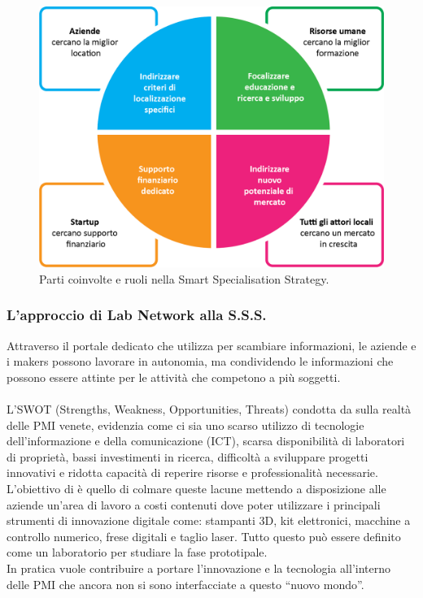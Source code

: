 \begin{figure}[H]
	\begin{center}
	\includegraphics[scale=0.37]{immagini/sss_graph.png}
	\caption{Parti coinvolte e ruoli nella Smart Specialisation Strategy.}
	\end{center}
\end{figure}
\subsubsection{L'approccio di Lab Network alla S.S.S.}
Attraverso il portale dedicato che \lab{} utilizza per scambiare informazioni, le aziende e i makers possono lavorare in autonomia, ma condividendo le informazioni che possono essere attinte per le attività che competono a più soggetti.\\
\\
L'\gls{SWOT} (Strengths, Weakness, Opportunities, Threats) condotta da \lab{} sulla realtà delle PMI venete, evidenzia come ci sia uno scarso utilizzo di tecnologie dell'informazione e della comunicazione (ICT), scarsa disponibilità di laboratori di proprietà, bassi investimenti in ricerca, difficoltà a sviluppare progetti innovativi e ridotta capacità di reperire risorse e professionalità necessarie. 
L'obiettivo di \lab{} è quello di colmare queste lacune mettendo a disposizione alle aziende un'area di lavoro a costi contenuti dove poter utilizzare i principali strumenti di innovazione digitale come: stampanti 3D, kit elettronici, macchine a controllo numerico, frese digitali e taglio laser. Tutto questo può essere definito come un laboratorio per studiare la fase prototipale.
\\
In pratica \lab{} vuole contribuire a portare l'innovazione e la tecnologia all'interno delle PMI che ancora non si sono interfacciate a questo ``nuovo mondo''.

